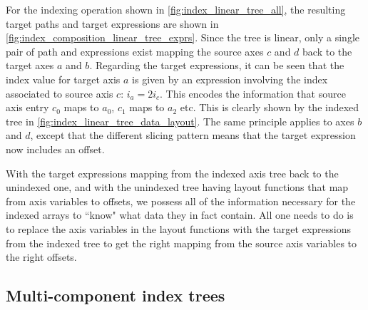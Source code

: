 \documentclass[thesis]{subfiles}
\begin{document}
For the indexing operation shown in \cref{fig:index_linear_tree_all}, the resulting target paths and target expressions are shown in \cref{fig:index_composition_linear_tree_exprs}.
Since the tree is linear, only a single pair of path and expressions exist mapping the source axes $c$ and $d$ back to the target axes $a$ and $b$.
Regarding the target expressions, it can be seen that the index value for target axis $a$ is given by an expression involving the index associated to source axis $c$: $i_a = 2 i_c$.
This encodes the information that source axis entry $c_0$ maps to $a_0$, $c_1$ maps to $a_2$ etc.
This is clearly shown by the indexed tree in \cref{fig:index_linear_tree_data_layout}.
The same principle applies to axes $b$ and $d$, except that the different slicing pattern means that the target expression now includes an offset.

With the target expressions mapping from the indexed axis tree back to the unindexed one, and with the unindexed tree having layout functions that map from axis variables to offsets, we possess all of the information necessary for the indexed arrays to ``know" what data they in fact contain.
All one needs to do is to replace the axis variables in the layout functions with the target expressions from the indexed tree to get the right mapping from the source axis variables to the right offsets.

\subsection{Multi-component index trees}

\end{document}
